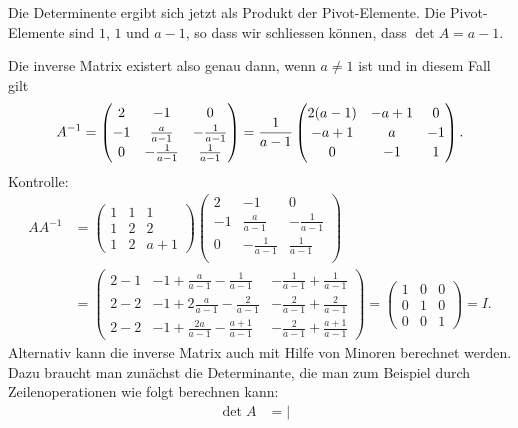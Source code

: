 \begin{loesung}
Die Determinente ergibt sich jetzt als Produkt der Pivot-Elemente.
Die Pivot-Elemente sind $1$, $1$ und $a-1$, so dass wir schliessen
können, dass $\det A=a-1$.

Die inverse Matrix existert also genau dann, wenn $a\ne 1$ ist und in diesem
Fall gilt
\[
A^{-1}
=
{
\renewcommand{\arraystretch}{1.15}
\begin{pmatrix}
 2&      -1     &            0\\
-1&\frac{a}{a-1}& -\frac1{a-1}\\
 0& -\frac1{a-1}&  \frac1{a-1}\\
\end{pmatrix}
}
=
\frac1{a-1}
\begin{pmatrix}
2(a-1)& -a+1 &  0\\
 -a+1 &  a   & -1\\
    0 &   -1 &  1
\end{pmatrix}.
\]
Kontrolle:
{
\renewcommand{\arraystretch}{1.15}
\begin{align*}
AA^{-1}
&=
\begin{pmatrix}
1&1&1\\
1&2&2\\
1&2&a+1
\end{pmatrix}
\begin{pmatrix}
 2&      -1     &            0\\
-1&\frac{a}{a-1}& -\frac1{a-1}\\
 0& -\frac1{a-1}&  \frac1{a-1}\\
\end{pmatrix}
\\
&=
\begin{pmatrix}
2-1 & -1+\frac{a}{a-1}-\frac{1}{a-1}   & -\frac1{a-1}+\frac1{a-1}     \\
2-2 & -1+2\frac{a}{a-1}-\frac{2}{a-1}  & -\frac{2}{a-1}+\frac{2}{a-1} \\
2-2 & -1+\frac{2a}{a-1}-\frac{a+1}{a-1}& -\frac2{a-1}+\frac{a+1}{a-1}
\end{pmatrix}
=
\begin{pmatrix}
1&0&0\\
0&1&0\\
0&0&1
\end{pmatrix}
=I.
\end{align*}%
}%
Alternativ kann die inverse Matrix auch mit Hilfe von Minoren
berechnet werden.
Dazu braucht man zunächst die Determinante, die man zum Beispiel
durch Zeilenoperationen wie folgt berechnen kann:
\begin{align*}
\det A
&=
\left|\begin{matrix}

\end{matrix}
\end{align*}
\end{loesung}
